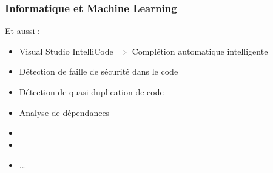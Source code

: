\begin{frame}
  \frametitle{Informatique et Machine Learning}
  Et aussi :
  \begin{itemize}
  \item Visual Studio IntelliCode $\Rightarrow$ Complétion automatique intelligente
  \item Détection de faille de sécurité dans le code
  \item Détection de quasi-duplication de code
  \item Analyse de dépendances
  \item {}
  \item {}
  \item ...
  \end{itemize}
\end{frame}
